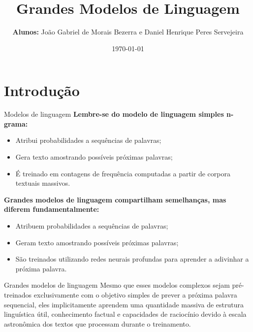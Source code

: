 \documentclass[aspectratio=169]{beamer}
\title{Grandes Modelos de Linguagem}
\author[Exame de Qualificação]{\textbf{Alunos:} João Gabriel de Morais Bezerra e Daniel Henrique Peres Servejeira}%
\institute{Laboratório de Simulações Numéricas e Inteligência Artificial}
\date{\today}
\begin{document}
\begin{frame}
    \titlepage{}
\end{frame}
\section{Introdução}

\begin{frame}{Modelos de linguagem}\justifying
    \textbf{Lembre-se do modelo de linguagem simples n-grama:}
    \begin{itemize}
        \item Atribui probabilidades a sequências de palavras;
        \item Gera texto amostrando possíveis próximas palavras;
        \item É treinado em contagens de frequência computadas a partir de corpora textuais massivos.
    \end{itemize}
    \vspace{0.5cm}
    \textbf{Grandes modelos de linguagem compartilham semelhanças, mas diferem fundamentalmente:}
    \begin{itemize}
        \item Atribuem probabilidades a sequências de palavras;
        \item Geram texto amostrando possíveis próximas palavras;
        \item São treinados utilizando redes neurais profundas para aprender a adivinhar a próxima palavra.
    \end{itemize}
\end{frame}

\begin{frame}{Grandes modelos de linguagem}\justifying
    Mesmo que esses modelos complexos sejam pré-treinados exclusivamente com o objetivo simples de prever a próxima palavra sequencial, eles implicitamente aprendem uma quantidade massiva de estrutura linguística útil, conhecimento factual e capacidades de raciocínio devido à escala astronômica dos textos que processam durante o treinamento.
\end{frame}
\end{document}

